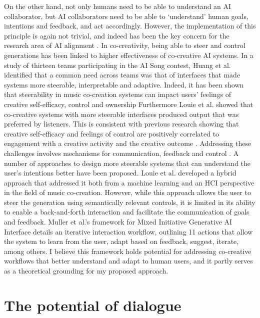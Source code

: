 On the other hand, not only humans need to be able to understand an AI collaborator, but AI collaborators need to be able to ‘understand’ human goals, intentions and feedback, and act accordingly. However, the implementation of this principle is again not trivial, and indeed has been the key concern for the research area of AI alignment \cite{Yudkowsky2016-wf}. In co-creativity, being able to steer and control generations has been linked to higher effectiveness of co-creative AI systems. In a study of thirteen teams participating in the AI Song contest, Huang et al. \cite{Huang2020-fh} identified that a common need across teams was that of interfaces that made systems more steerable, interpretable and adaptive. Indeed, it has been shown that steerability in music co-creation systems can impact users' feelings of creative self-efficacy, control and ownership Furthermore Louie et al. \cite{Louie2020-aq} showed that co-creative systems with more steerable interfaces produced output that was preferred by listeners. This is consistent with previous research showing that creative self-efficacy and feelings of control are positively correlated to engagement with a creative activity and the creative outcome \cite{Tierney2002-xp, Louie2020-aq}. Addressing these challenges involves mechanisms for communication, feedback and control \cite{Wang2020-cw}. A number of approaches to design more steerable systems that can understand the user's intentions better have been proposed. Louie et al. developed a hybrid approach that addressed it both from a machine learning and an HCI perspective in the field of music co-creation. However, while this approach allows the user to steer the generation using semantically relevant controls, it is limited in its ability to enable a back-and-forth interaction and facilitate the communication of goals and feedback. Muller et al.'s \cite{Muller2020-nv} framework for Mixed Initiative Generative AI Interface details an iterative interaction workflow, outlining 11 actions that allow the system to learn from the user, adapt based on feedback, suggest, iterate, among others. I believe this framework holds potential for addressing co-creative workflows that better understand and adapt to human users, and it partly serves as a theoretical grounding for my proposed approach. 

\section{The potential of dialogue}

